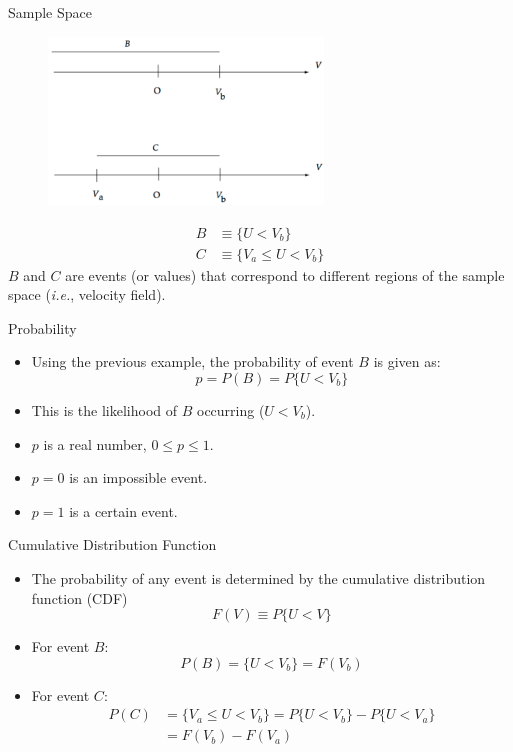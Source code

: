 
\begin{frame}{Sample Space}
  \begin{figure}[H]
  \centering
  \includegraphics[width=0.65\textwidth]{samplespace.png}
  \end{figure}
  \begin{align*}
  B &\equiv \{U < V_b \}\\C &\equiv \{V_a \leq U < V_b \}
  \end{align*}
  $B$ and $C$ are events (or values) that correspond to different regions of the sample space (\textit{i.e.}, velocity field).
  
\end{frame}


\begin{frame}{Probability}
\begin{itemize}
  	\item Using the previous example, the probability of event $B$ is given as:
  	$$p=P(B)=P\{U<V_b\}$$
  	\item This is the likelihood of $B$ occurring ($U<V_b$).
  	\item $p$ is a real number, $0 \leq p \leq 1$.
  	\item $p = 0$ is an impossible event.
  	\item $p = 1$ is a certain event.
  \end{itemize}
\end{frame}


\begin{frame}{Cumulative Distribution Function}
\begin{itemize}
  	\item The probability of any event is determined by the cumulative distribution function (CDF)
  	$$F(V) \equiv P\{U<V\}$$
  	\item For event $B$:
  	$$P(B) = \{U < V_b \} = F(V_b)$$
  	\item For event $C$:
  	\begin{align*}
  	P(C) &= \{V_a \leq U < V_b \} = P\{U < V_b \} - P\{U < V_a \}\\ &= F(V_b) - F(V_a)
  	\end{align*}
  \end{itemize}
\end{frame}

